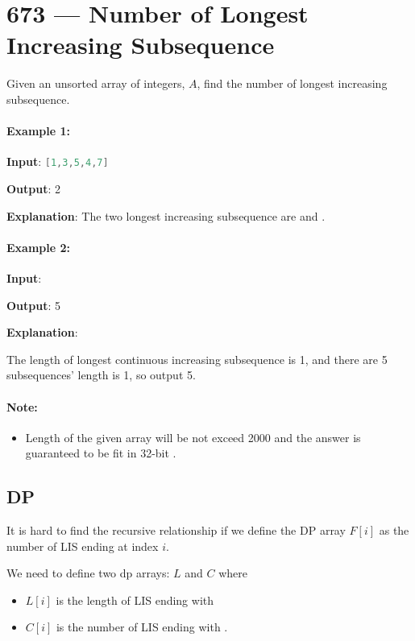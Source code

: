 \section{673 --- Number of Longest Increasing Subsequence}
Given an unsorted array of integers, $A$,  find the number of longest increasing subsequence.

\paragraph{Example 1:}
\begin{flushleft}


\textbf{Input}: \lstinline[language=C++, basicstyle=\small\ttfamily, keywordstyle=\bfseries\color{green!40!black}]|[1,3,5,4,7]|

\textbf{Output}: 2

\textbf{Explanation}: The two longest increasing subsequence are \fcj{[1, 3, 4, 7]} and \fcj{[1, 3, 5, 7]}.
\end{flushleft}

\paragraph{Example 2:}
\begin{flushleft}

\textbf{Input}: \fcj{[2,2,2,2,2]}

\textbf{Output}: 5

\textbf{Explanation}: 

The length of longest continuous increasing subsequence is 1, and there are 5 subsequences' length is 1, so output 5.
\end{flushleft}

\paragraph{Note:} 
\begin{itemize}
\item Length of the given array will be not exceed 2000 and the answer is guaranteed to be fit in 32-bit .
\end{itemize}

\subsection{DP}
It is hard to find the recursive relationship if we define the DP array $F[i]$ as the number of LIS ending at index $i$.

We need to define two dp arrays: $L$ and $C$ where 
\begin{itemize}
\item $L[i]$ is the length of LIS ending with 
\item $C[i]$ is the number of LIS ending with .
\end{itemize}


